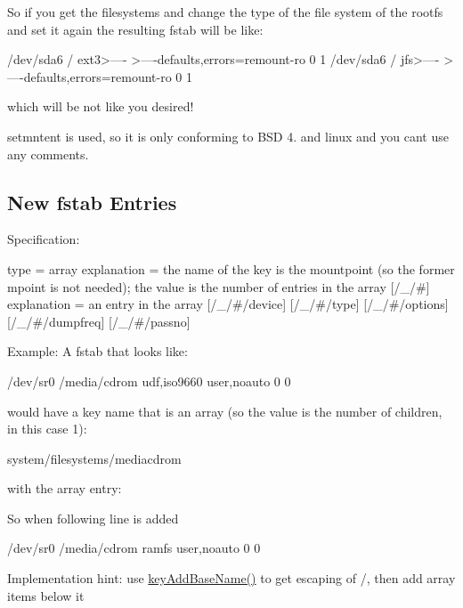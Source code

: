 So if you get the filesystems and change the type of the file system of the rootfs and set it again the resulting fstab will be like\+: \begin{DoxyVerb}/dev/sda6       /               ext3>----   >----defaults,errors=remount-ro 0 1
/dev/sda6       /               jfs>----   >----defaults,errors=remount-ro 0 1
\end{DoxyVerb}


which will be not like you desired!

setmntent is used, so it is only conforming to B\+SD 4. and linux and you can\textquotesingle{}t use any comments.

\subsection*{New fstab Entries}

Specification\+: \begin{DoxyVerb}[/_]
type = array
explanation = the name of the key is the mountpoint (so the former
  mpoint is not needed); the value is the number of entries in the
  array
[/_/#]
explanation = an entry in the array
[/_/#/device]
[/_/#/type]
[/_/#/options]
[/_/#/dumpfreq]
[/_/#/passno]
\end{DoxyVerb}


Example\+: A fstab that looks like\+: \begin{DoxyVerb}/dev/sr0        /media/cdrom   udf,iso9660 user,noauto     0       0
\end{DoxyVerb}


would have a key name that is an array (so the value is the number of children, in this case 1)\+: \begin{DoxyVerb}system/filesystems/\/media\/cdrom
\end{DoxyVerb}


with the array entry\+: 


So when following line is added \begin{DoxyVerb}/dev/sr0        /media/cdrom   ramfs user,noauto     0       0
\end{DoxyVerb}


Implementation hint\+: use {\ttfamily \hyperlink{group__keyname_gaa942091fc4bd5c2699e49ddc50829524}{key\+Add\+Base\+Name()}} to get escaping of {\ttfamily /}, then add array items below it


